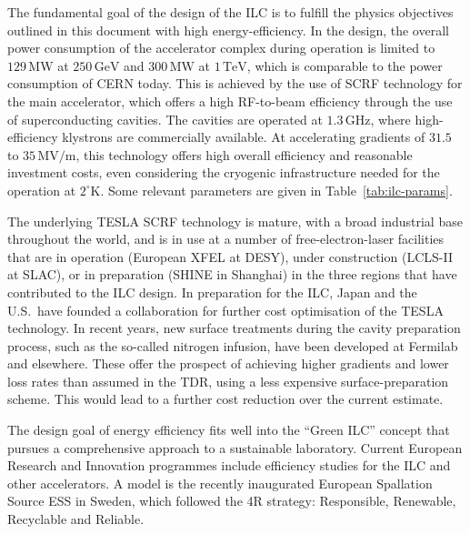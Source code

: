 \documentclass[%
 reprint,
 amsmath,amssymb,
 aps,
]{revtex4-1}
\begin{document}
The fundamental goal of the design of the ILC is to fulfill the
physics objectives outlined in this document  with high energy-efficiency.  In the design,
the overall power consumption of the accelerator complex during operation is limited to $129\,{\mathrm{MW}}$ at  $250\,{\mathrm{GeV}}$ and $300\,{\mathrm{MW}}$ at  $1\,{\mathrm{TeV}}$, which is comparable to the power consumption of CERN today.
This is achieved by the use of SCRF technology for the main
accelerator, which offers a high RF-to-beam efficiency through the use
of superconducting cavities.  The cavities are operated at 
 $1.3\,{\mathrm{GHz}}$, where high-efficiency klystrons are commercially available.
At accelerating gradients of $31.5$ to $35\,{\mathrm{MV/m}}$, this
technology offers high overall efficiency and reasonable investment
costs, even considering the cryogenic infrastructure needed for the
operation 
at $2^\circ{\mathrm{K}}$. Some relevant parameters are given in Table~\ref{tab:ilc-params}.

The underlying TESLA SCRF technology is mature, with a broad industrial
base throughout the world, and is in use at a number of free-electron-laser
facilities that are in operation (European XFEL at DESY), under construction (LCLS-II at SLAC),
 or in preparation (SHINE in Shanghai) in the three regions that have
 contributed to the ILC design. In preparation for the ILC, Japan and
 the U.S.\ 
have founded a collaboration for further cost optimisation of the TESLA technology.
In recent years, new surface treatments during the cavity preparation
process, such as the so-called nitrogen infusion, have been 
developed at Fermilab and elsewhere.
These offer the prospect of  achieving  higher gradients and lower loss
rates than
assumed in the TDR, using a less expensive surface-preparation scheme.
This  would lead to a
 further cost reduction over
the current
 estimate.
 
 The design goal of energy efficiency fits well into the ``Green ILC'' concept \cite{GreenILC} that pursues a comprehensive approach to a sustainable laboratory.  Current European Research and Innovation programmes include
 efficiency studies for the ILC and other accelerators. 
A model is the recently inaugurated European Spallation Source ESS in Sweden, which followed the 4R strategy: Responsible, Renewable, Recyclable and Reliable.
\end{document}

